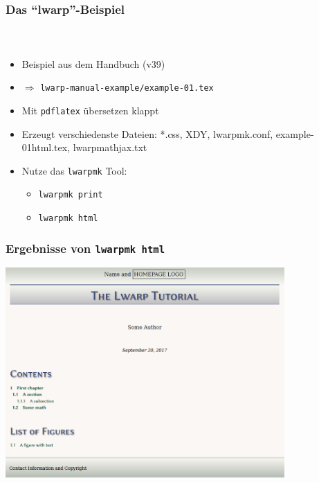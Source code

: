 \documentclass[12pt,ngerman]{beamer}
\begin{document}
\begin{frame}
\frametitle{Das \enquote{lwarp}-Beispiel}
\framesubtitle{~}

\begin{itemize}
\item Beispiel aus dem Handbuch (v39)
\item $\Rightarrow$ \texttt{lwarp-manual-example/example-01.tex}
\item Mit \texttt{pdflatex} übersetzen klappt 
\item Erzeugt verschiedenste Dateien: *.css, XDY, lwarpmk.conf, example-01\textunderscore html.tex, lwarp\textunderscore  mathjax.txt
\item Nutze das \texttt{lwarpmk} Tool:
\begin{itemize}
	\item \texttt{lwarpmk print}
	\item \texttt{lwarpmk html}
	\end{itemize}
\end{itemize}
\end{frame}

\begin{frame}
\frametitle{Ergebnisse von \texttt{lwarpmk html}}

\begin{center}
\includegraphics[width=0.8\textwidth]{lwarp-manual-example/bild-01.png}
\end{center}

\end{frame}
\end{document}
